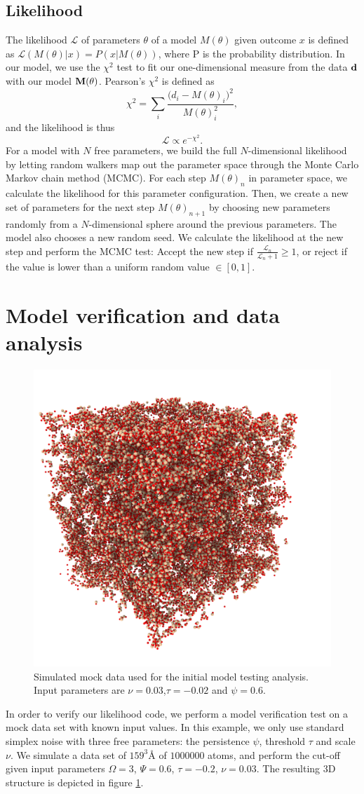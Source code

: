 \documentclass[aps,pre,twocolumn,letterpaper,floatfix,showpacs]{revtex4}
\begin{document}
\subsection{Likelihood}
The likelihood $\mathcal{L}$ of parameters $\theta$ of a model $M(\theta)$ given outcome $x$ is defined as $\mathcal{L} (M(\theta) | x) = P( x | M(\theta))$, where P is the probability distribution. In our model, we use the $\chi^2$ test to fit our one-dimensional measure from the data $\bf d$ with our model $\bf M(\theta)$. Pearson's $\chi^2$ is defined as 
\begin{equation}
  \chi^2 = \sum_i \frac{ \Big(d_i - M(\theta)_i \Big)^2}{M(\theta)_i^2},
\end{equation}    
and the likelihood is thus
\begin{equation}
\mathcal L \propto e^{-\chi^2}.
\end{equation}
For a model with $N$ free parameters, we build the full $N$-dimensional likelihood by letting random walkers map out the parameter space through the Monte Carlo Markov chain method (MCMC). For each step $M(\theta)_n$ in parameter space, we calculate the likelihood for this parameter configuration. Then, we create a new set of parameters for the next step $M(\theta)_{n+1}$ by choosing new parameters randomly from a $N$-dimensional sphere around the previous parameters. The model also chooses a new random seed. We calculate the likelihood at the new step and perform the MCMC test: Accept the new step if $\frac{\mathcal L_n}{\mathcal L_n+1} \ge 1$, or reject if the value is lower than a uniform random value $\in [0,1]$.  

\section{Model verification and data analysis}
\begin{figure}[htb!]
\includegraphics[width=.45\textwidth]{model_test.png}
\caption{Simulated mock data used for the initial model testing analysis. Input parameters are $\nu=0.03$,$\tau=-0.02$ and $\psi=0.6$.}
\label{fig:mockdata}
\end{figure}
In order to verify our likelihood code, we perform a model verification test on a mock data set with known input values. In this example, we only use standard simplex noise with three free parameters: the persistence $\psi$, threshold $\tau$ and scale $\nu$. We simulate a data set of $159 ^3 Å$ of $1 000 000$ atoms, and perform the cut-off given input parameters $\Omega=3$, $\Psi = 0.6$, $\tau=-0.2$, $\nu=0.03$. The resulting 3D structure is depicted in figure \ref{fig:mockdata}. 
\end{document}
